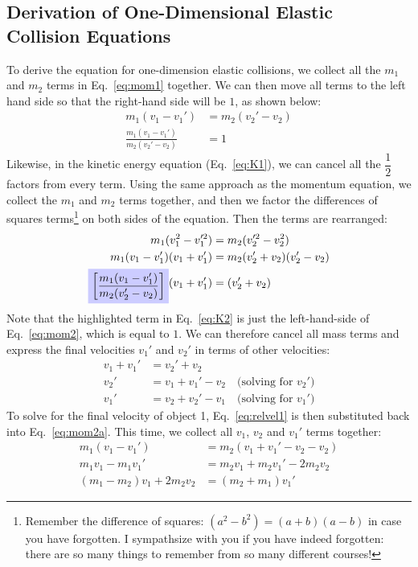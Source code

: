 \subsection{Derivation of One-Dimensional Elastic Collision Equations}
To derive the equation for one-dimension elastic collisions, we collect
all the $m_1$ and $m_2$ terms in Eq.~\ref{eq:mom1} together. We can then move
all terms to the left hand side so that the right-hand side will be $1$, as
shown below:
\begin{align}
  m_1(v_1-v_1')&=m_2(v_2'-v_2) \label{eq:mom2a}\\
  \frac{m_1(v_1-v_1')}{m_2(v_2'-v_2)}&=1 \label{eq:mom2}
\end{align}
Likewise, in the kinetic energy equation (Eq.\ \ref{eq:K1}), we can cancel all
the $\dfrac12$ factors from every term. Using the same approach
as the momentum equation, we collect the $m_1$ and $m_2$ terms together, and
then we factor the differences of squares terms\footnote{Remember the
difference of squares: $(a^2-b^2)=(a+b)(a-b)$ in case you have forgotten. I
sympathsize with you if you have indeed forgotten: there are so many things
to remember from so many different courses!} on both sides of the equation.
Then the  terms are rearranged:
\begin{align}
  \nonumber m_1(v_1^2-v_1'^2) &= m_2(v_2'^2-v_2^2)\\
  \nonumber m_1(v_1-v_1')(v_1+v_1') &= m_2(v_2'+v_2)(v_2'-v_2)\\
  \tikz[baseline]{
    \node[fill=blue!20] (n1) {
      $\left[\dfrac{m_1(v_1-v_1')}{m_2(v_2'-v_2)}\right]$
    }
  }(v_1+v_1') &= (v_2'+v_2)
  \label{eq:K2}
\end{align}
Note that the highlighted term in Eq.~\ref{eq:K2} is just the left-hand-side
of Eq.~\ref{eq:mom2}, which is equal to $1$. We can therefore cancel all mass
terms and express the final velocities $v_1'$ and $v_2'$ in terms of other
velocities:
\begin{align}
  \nonumber
  v_1+v_1' &= v_2'+v_2\\
  v_2'&=v_1+v_1'-v_2\quad\text{(solving for $v_2'$)}\label{eq:relvel1}\\
  v_1'&=v_2+v_2'-v_1\quad\text{(solving for $v_1'$)}\label{eq:relvel}
\end{align}
To solve for the final velocity of object 1, Eq.~\ref{eq:relvel1} is then
substituted back into Eq.~\ref{eq:mom2a}. This time, we collect all $v_1$,
$v_2$ and $v_1'$ terms together:
\begin{align}
  \nonumber
  m_1(v_1-v_1')&=m_2(v_1+v_1'-v_2-v_2)\\
  \nonumber
  m_1v_1-m_1v_1'&=m_2v_1+m_2v_1'-2m_2v_2\\
  (m_1-m_2)v_1+2m_2v_2&=(m_2+m_1)v_1'
  \label{eq:mom3}
\end{align}
